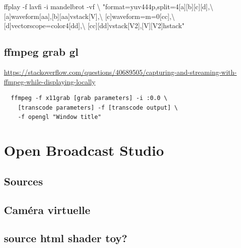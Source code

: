 \documentclass[
  french,
]{book}
\newenvironment{Shaded}{\begin{snugshade}}{\end{snugshade}}
\newcommand{\AttributeTok}[1]{\textcolor[rgb]{0.77,0.63,0.00}{#1}}
\newcommand{\DataTypeTok}[1]{\textcolor[rgb]{0.13,0.29,0.53}{#1}}
\newcommand{\ExtensionTok}[1]{#1}
\newcommand{\NormalTok}[1]{#1}
\newcommand{\StringTok}[1]{\textcolor[rgb]{0.31,0.60,0.02}{#1}}
\begin{document}
\begin{Shaded}
\begin{Highlighting}[]
\ExtensionTok{ffplay} \AttributeTok{{-}f}\NormalTok{ lavfi }\AttributeTok{{-}i}\NormalTok{ mandelbrot }\AttributeTok{{-}vf} \DataTypeTok{\textbackslash{}}
\StringTok{"format=yuv444p,split=4[a][b][c][d],}\DataTypeTok{\textbackslash{}}
\StringTok{[a]waveform[aa],[b][aa]vstack[V],}\DataTypeTok{\textbackslash{}}
\StringTok{[c]waveform=m=0[cc],}\DataTypeTok{\textbackslash{}}
\StringTok{[d]vectorscope=color4[dd],}\DataTypeTok{\textbackslash{}}
\StringTok{[cc][dd]vstack[V2],[V][V2]hstack"}
\end{Highlighting}
\end{Shaded}

\hypertarget{ffmpeg-grab-gl}{%
\section{ffmpeg grab gl}\label{ffmpeg-grab-gl}}

\url{https://stackoverflow.com/questions/40689505/capturing-and-streaming-with-ffmpeg-while-displaying-locally}

\begin{verbatim}
  ffmpeg -f x11grab [grab parameters] -i :0.0 \
    [transcode parameters] -f [transcode output] \
    -f opengl "Window title"
\end{verbatim}

\hypertarget{obs}{%
\chapter{Open Broadcast Studio}\label{obs}}

\hypertarget{sources-1}{%
\section{Sources}\label{sources-1}}

\hypertarget{camuxe9ra-virtuelle-1}{%
\section{Caméra virtuelle}\label{camuxe9ra-virtuelle-1}}

\hypertarget{source-html-shader-toy}{%
\section{source html shader toy?}\label{source-html-shader-toy}}
\end{document}
